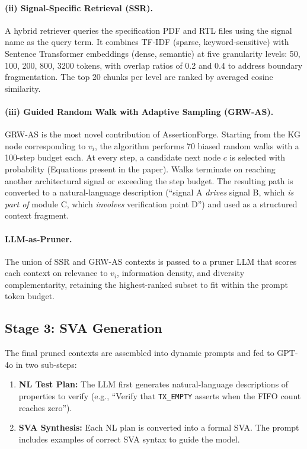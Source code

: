 \documentclass[12pt,a4paper]{article}
\begin{document}
\paragraph{(ii) Signal-Specific Retrieval (SSR).}
A hybrid retriever queries the specification PDF and RTL files using the signal
name as the query term. It combines TF-IDF (sparse, keyword-sensitive) with
Sentence Transformer embeddings (dense, semantic) at five granularity levels:
50, 100, 200, 800, 3200 tokens, with overlap ratios of 0.2 and 0.4 to address
boundary fragmentation. The top 20 chunks per level are ranked by averaged
cosine similarity.

\paragraph{(iii) Guided Random Walk with Adaptive Sampling (GRW-AS).}
GRW-AS is the most novel contribution of AssertionForge. Starting from the KG
node corresponding to $v_i$, the algorithm performs 70 biased random walks
with a 100-step budget each. At every step, a candidate next node $c$ is
selected with probability (Equations present in the paper). Walks terminate on reaching another architectural signal or exceeding the step
budget. The resulting path is converted to a natural-language description
(``signal A \emph{drives} signal B, which \emph{is part of} module C, which
\emph{involves} verification point D'') and used as a structured context
fragment.

\paragraph{LLM-as-Pruner.}
The union of SSR and GRW-AS contexts is passed
to a pruner LLM that scores each context on relevance to $v_i$, information
density, and diversity complementarity, retaining the highest-ranked subset
to fit within the prompt token budget.

\subsection{Stage 3: SVA Generation}

The final pruned contexts are assembled into dynamic prompts and fed to
GPT-4o in two sub-steps:

\begin{enumerate}[noitemsep, label=\arabic*.]
  \item \textbf{NL Test Plan:} The LLM first generates natural-language
        descriptions of properties to verify (e.g., ``Verify that
        \texttt{TX\_EMPTY} asserts when the FIFO count reaches zero'').
  \item \textbf{SVA Synthesis:} Each NL plan is converted into a formal SVA.
        The prompt includes examples of correct SVA syntax to guide the model.
\end{enumerate}
\end{document}
